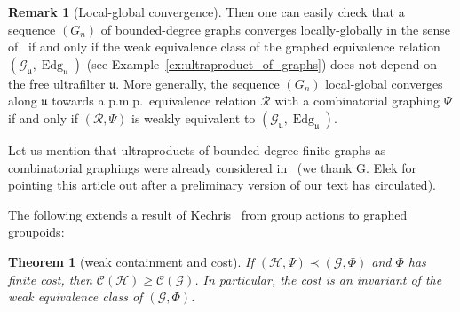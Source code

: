 \documentclass[10pt]{amsart}
\newtheorem{theo}[cdrthm]{Theorem}
\theoremstyle{definition}
\newtheorem{rema}[cdrthm]{Remark}
\newcommand{\RR}{\mathcal{R}}
\newcommand{\cost}{\mathcal{C}}
\newcommand{\ch}{\mathcal{H}}
\newcommand{\cg}{\mathcal{G}}
\DeclareMathOperator{\Edg}{Edg}
\newcommand{\ul}{\mathfrak{u}}
\newcommand{\pmp}{p.m.p.\ }
\newcommand*{\MK}{\mkern 2mu}
\begin{document}
\begin{rema}[Local-global convergence]
Then one can easily check that a sequence $(G_n)$ of bounded-degree graphs converges locally-globally in the sense of~\cite{HatLovSze} if and only if the weak equivalence class of the graphed equivalence relation $(\cg_\ul,\Edg_\ul)$ (see Example~\ref{ex:ultraproduct_of_graphs}) does not depend on the free ultrafilter $\ul$. More generally, the sequence $(G_n)$ local-global converges along $\ul$ towards a \pmp equivalence relation $\RR$ with a combinatorial graphing $\Psi$ if and only if $(\RR,\Psi)$ is weakly equivalent to $(\cg_\ul,\Edg_\ul)$.

Let us mention that ultraproducts of bounded degree finite graphs as combinatorial graphings were already considered in~\cite{Elek-2010-param-test} (we thank G. Elek for pointing this article out after a preliminary version of our text has circulated).
\end{rema}



The following extends a result of Kechris~\cite[end of Section~10$\MK$(C)]{Kechris-Global-aspects-2010} from group actions to graphed groupoids:
\begin{theo}[weak containment and cost]
If $(\ch,\Psi) \prec (\cg, \Phi)$ and $\Phi$ has finite cost, then $\cost (\ch) \geq \cost(\cg)$. In particular, the cost is an invariant of the weak equivalence class of $(\cg, \Phi)$.
\end{theo}
\end{document}
